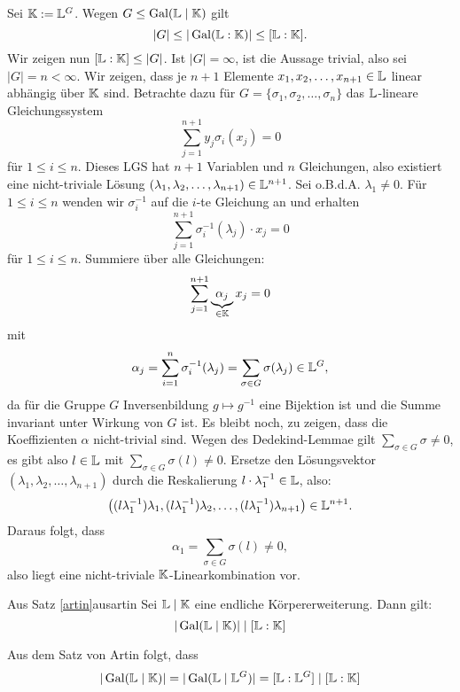 \begin{beweis}
Sei $\mathbb{K} := \mathbb{L}^G$. Wegen $G \leq \operatorname{\text{Gal}}(\mathbb{L} \mid \mathbb{K})$ gilt
\begin{equation}
|G| \leq |\operatorname{\text{Gal}}(\mathbb{L} : \mathbb{K})| \leq [\mathbb{L} : \mathbb{K}].
\end{equation}
Wir zeigen nun $[\mathbb{L}:\mathbb{K}] \leq |G|$. Ist $|G|=\infty$, ist die Aussage trivial, also sei $|G|=n<\infty$. Wir zeigen, dass je $n+1$ Elemente $x_1, x_2, \dots, x_{n+1} \in \mathbb{L}$ linear abhängig über $\mathbb{K}$ sind. Betrachte dazu für $G=\{\sigma_1, \sigma_2, \dots, \sigma_n\}$ das $\mathbb{L}$-lineare Gleichungssystem
\begin{equation}
\sum_{j=1}^{n+1} y_j \sigma_i(x_j) = 0
\end{equation}
für $1 \leq i \leq n$. Dieses LGS hat $n+1$ Variablen und $n$ Gleichungen, also existiert eine nicht-triviale Lösung $(\lambda_1, \lambda_2, \dots, \lambda_{n+1}) \in \mathbb{L}^{n+1}$. Sei o.B.d.A. $\lambda_1 \neq 0$. Für $1 \leq i \leq n$ wenden wir $\sigma_i^{-1}$ auf die $i$-te Gleichung an und erhalten
\begin{equation}
\sum_{j=1}^{n+1} \sigma_i^{-1}(\lambda_j) \cdot x_j = 0
\end{equation}
für $1 \leq i \leq n$. Summiere über alle Gleichungen:
\begin{equation}
\sum_{j=1}^{n+1} \underbrace{\alpha_j}_{\in \mathbb{K}} x_j = 0
\end{equation}
mit
\begin{equation}
\alpha_j = \sum_{i=1}^n \sigma_i^{-1}(\lambda_j)=\sum_{\sigma \in G} \sigma(\lambda_j) \in \mathbb{L}^G,
\end{equation}
da für die Gruppe $G$ Inversenbildung $g \mapsto g^{-1}$ eine Bijektion ist und die Summe invariant unter Wirkung von $G$ ist. Es bleibt noch, zu zeigen, dass die Koeffizienten $\alpha$ nicht-trivial sind. Wegen des Dedekind-Lemmae gilt $\sum_{\sigma \in G} \sigma \neq 0$, es gibt also $l \in \mathbb{L}$ mit $\sum_{\sigma \in G} \sigma (l)\neq 0$. Ersetze den Lösungsvektor $(\lambda_1, \lambda_2, \dots, \lambda_{n+1})$ durch die Reskalierung $l\cdot \lambda_1^{-1} \in \mathbb{L}$, also:
\begin{equation}
\left( (l\lambda_1^{-1}) \lambda_1, (l\lambda_1^{-1}) \lambda_2, \dots, (l\lambda_1^{-1}) \lambda_{n+1} \right) \in \mathbb{L}^{n+1}.
\end{equation}
Daraus folgt, dass
\begin{equation}
\alpha_1 = \sum_{\sigma \in G} \sigma(l) \neq 0 ,
\end{equation}
also liegt eine nicht-triviale $\mathbb{K}$-Linearkombination vor.
\end{beweis}
\begin{korollar}{Aus Satz \ref{artin}}{ausartin}
Sei $\mathbb{L} \mid \mathbb{K}$ eine endliche Körpererweiterung. Dann gilt:
\begin{equation}
|\operatorname{\text{Gal}}(\mathbb{L} \mid \mathbb{K})| \mid [\mathbb{L} : \mathbb{K}]
\end{equation}
\end{korollar}
\begin{beweis}
Aus dem Satz von Artin folgt, dass
\begin{equation}
|\operatorname{\text{Gal}}(\mathbb{L} \mid \mathbb{K})| = |\operatorname{\text{Gal}}(\mathbb{L} \mid \mathbb{L}^G)| = [\mathbb{L} : \mathbb{L}^G] \mid [\mathbb{L} : \mathbb{K}]
\end{equation}
\end{beweis}

